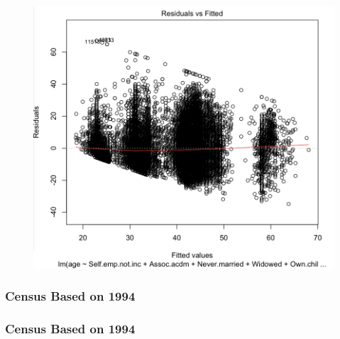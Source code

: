 \documentclass{beamer}
\begin{document}
\begin{frame}
\frametitle{}

\begin{figure}
 \includegraphics[scale=0.3]{figures/ageResidCensus.png}
 \label{fig:ageResidCensus}
\end{figure}
 
\end{frame}

\begin{frame}
\frametitle{Census Based on 1994}
\end{frame}

\begin{frame}
\frametitle{Census Based on 1994}
\end{frame}
\end{document}
